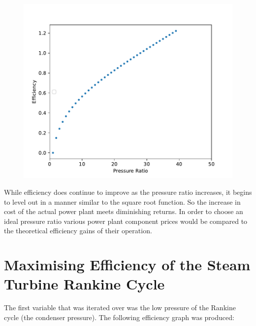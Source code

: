 \documentclass{article}
\begin{document}
\begin{figure}
    \centering
    \includegraphics{presureratioefficiencygraph.pdf}
    \caption{}
    
    \label{fig:my_label}
\end{figure}

\FloatBarrier

While efficiency does continue to improve as the pressure ratio increases, it begins to level out in a manner similar to the square root function. So the increase in cost of the actual power plant meets diminishing returns. In order to choose an ideal pressure ratio various power plant component prices would be compared to the theoretical efficiency gains of their operation.

\section{Maximising Efficiency of the Steam Turbine Rankine Cycle}
The first variable that was iterated over was the low pressure of the Rankine cycle (the condenser pressure). The following efficiency graph was produced:
\end{document}
